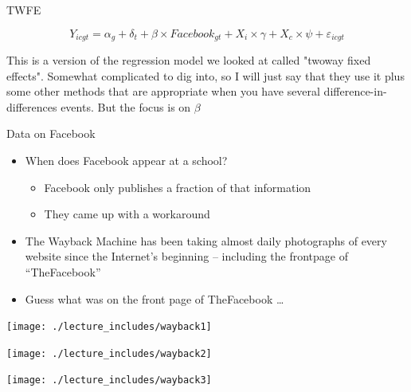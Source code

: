 \documentclass{beamer}
\begin{document}
\begin{frame}{TWFE}

\begin{equation}
Y_{icgt} = \alpha_g + \delta_t + \beta \times Facebook_{gt} + X_i \times \gamma + X_c \times \psi + \varepsilon_{icgt}
\end{equation}

\bigskip

This is a version of the regression model we looked at called "twoway fixed effects".  Somewhat complicated to dig into, so I will just say that they use it plus some other methods that are appropriate when you have several difference-in-differences events.  But the focus is on $\beta$

\end{frame}


\begin{frame}{Data on Facebook}

\begin{itemize}

\item When does Facebook appear at a school?  
	\begin{itemize}
	\item Facebook only publishes a fraction of that information
	\item They came up with a workaround
	\end{itemize}
\item The Wayback Machine has been taking almost daily photographs of every website since the Internet's beginning -- including the frontpage of ``TheFacebook''
\item Guess what was on the front page of TheFacebook \dots

\end{itemize}

\end{frame}

\begin{frame}
\begin{center}
\texttt{[image: ./lecture\_includes/wayback1]}
\end{center}
\end{frame}

\begin{frame}
\begin{center}
\texttt{[image: ./lecture\_includes/wayback2]}
\end{center}
\end{frame}

\begin{frame}
\begin{center}
\texttt{[image: ./lecture\_includes/wayback3]}
\end{center}
\end{frame}
\end{document}
